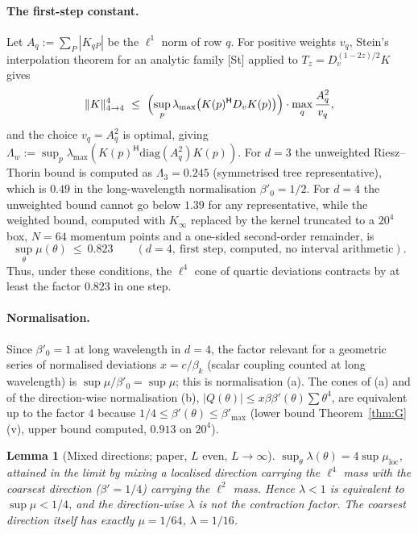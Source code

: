 \documentclass[11pt,a4paper]{article}
\newtheorem{lemma}[theorem]{Lemma}
\theoremstyle{definition}
\theoremstyle{remark}
\begin{document}
\paragraph{The first-step constant.}
Let $A_q:=\sum_P|K_{qP}|$ be the $\ell^1$ norm of row $q$. For positive weights $v_q$, Stein's interpolation theorem for an analytic family [St] applied to $T_z=D_v^{(1-2z)/2}K$ gives
\[
\|K\|_{4\to4}^4\ \le\ \Bigl(\sup_{p}\lambda_{\max}\bigl(K(p)^{\mathsf H}D_vK(p)\bigr)\Bigr)\cdot\max_q\frac{A_q^2}{v_q},
\]
and the choice $v_q=A_q^2$ is optimal, giving $\Lambda_w:=\sup_p\lambda_{\max}(K(p)^{\mathsf H}\mathrm{diag}(A_q^2)K(p))$.
For $d=3$ the unweighted Riesz--Thorin bound is computed as $\Lambda_3=0.245$ (symmetrised tree representative), which is $0.49$ in the long-wavelength normalisation $\beta'_0=1/2$.
For $d=4$ the unweighted bound cannot go below $1.39$ for any representative, while the weighted bound, computed with $K_\infty$ replaced by the kernel truncated to a $20^4$ box, $N=64$ momentum points and a one-sided second-order remainder, is
\[
\sup_\theta\mu(\theta)\ \le\ 0.823\qquad(d=4,\ \text{first step, computed, no interval arithmetic}).
\]
Thus, under these conditions, the $\ell^4$ cone of quartic deviations contracts by at least the factor $0.823$ in one step.

\paragraph{Normalisation.}
Since $\beta'_0=1$ at long wavelength in $d=4$, the factor relevant for a geometric series of normalised deviations $x=c/\beta_k$ (scalar coupling counted at long wavelength) is $\sup\mu/\beta'_0=\sup\mu$; this is normalisation (a). The cones of (a) and of the direction-wise normalisation (b), $|Q(\theta)|\le x\beta\beta'(\theta)\sum\theta^4$, are equivalent up to the factor $4$ because $1/4\le\beta'(\theta)\le\beta'_{\max}$ (lower bound Theorem~\ref{thm:G}(v), upper bound computed, $0.913$ on $20^4$).

\begin{lemma}[Mixed directions; paper, $L$ even, $L\to\infty$]\label{lem:mixed}
$\sup_\theta\lambda(\theta)=4\sup\mu_{\mathrm{loc}}$, attained in the limit by mixing a localised direction carrying the $\ell^4$ mass with the coarsest direction ($\beta'=1/4$) carrying the $\ell^2$ mass. Hence $\lambda<1$ is equivalent to $\sup\mu<1/4$, and the direction-wise $\lambda$ is not the contraction factor. The coarsest direction itself has exactly $\mu=1/64$, $\lambda=1/16$.
\end{lemma}
\end{document}
